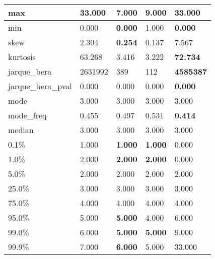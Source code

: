 \begin{table}[H]
\begin{tabular}{|l|m{10em}|m{10em}|m{10em}|m{10em}|}
\hline max & 33.000 & \cellcolor[rgb]{0.9, 0.54, 0.52} 7.000 & 9.000 & \bfseries 33.000 \\
\hline min & 0.000 & \bfseries 0.000 & \cellcolor[rgb]{0.9, 0.54, 0.52} 1.000 & \bfseries 0.000 \\
\hline skew & 2.304 & \bfseries 0.254 & 0.137 & \cellcolor[rgb]{0.9, 0.54, 0.52} 7.567 \\
\hline kurtosis & 63.268 & 3.416 & \cellcolor[rgb]{0.9, 0.54, 0.52} 3.222 & \bfseries 72.734 \\
\hline jarque\_bera & 2631992 & 389 & \cellcolor[rgb]{0.9, 0.54, 0.52} 112 & \bfseries 4585387 \\
\hline jarque\_bera\_pval & 0.000 & 0.000 & \cellcolor[rgb]{0.9, 0.54, 0.52} 0.000 & \bfseries 0.000 \\
\hline mode & 3.000 & 3.000 & 3.000 & 3.000 \\
\hline mode\_freq & 0.455 & 0.497 & \cellcolor[rgb]{0.9, 0.54, 0.52} 0.531 & \bfseries 0.414 \\
\hline median & 3.000 & 3.000 & 3.000 & 3.000 \\
\hline 0.1\% & 1.000 & \bfseries 1.000 & \bfseries 1.000 & \cellcolor[rgb]{0.9, 0.54, 0.52} 0.000 \\
\hline 1.0\% & 2.000 & \bfseries 2.000 & \bfseries 2.000 & \cellcolor[rgb]{0.9, 0.54, 0.52} 0.000 \\
\hline 5.0\% & 2.000 & 2.000 & 2.000 & 2.000 \\
\hline 25.0\% & 3.000 & 3.000 & 3.000 & 3.000 \\
\hline 75.0\% & 4.000 & 4.000 & 4.000 & 4.000 \\
\hline 95.0\% & 5.000 & \bfseries 5.000 & \cellcolor[rgb]{0.9, 0.54, 0.52} 4.000 & \cellcolor[rgb]{0.9, 0.54, 0.52} 6.000 \\
\hline 99.0\% & 6.000 & \bfseries 5.000 & \bfseries 5.000 & \cellcolor[rgb]{0.9, 0.54, 0.52} 9.000 \\
\hline 99.9\% & 7.000 & \bfseries 6.000 & 5.000 & \cellcolor[rgb]{0.9, 0.54, 0.52} 33.000 \\
\hline
\end{tabular}
\end{table}
